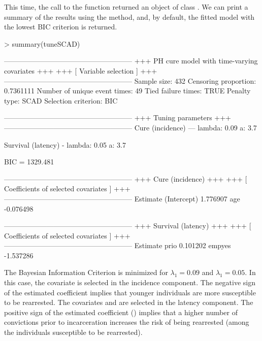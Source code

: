 This time, the call to the  function returned an object of class . 
We can print a summary of the results using the  method, and, by default, the fitted model with the lowest BIC criterion is returned.


\begin{example}
> summary(tuneSCAD)

------------------------------------------------------
+++   PH cure model with time-varying covariates   +++
+++             [ Variable selection ]             +++
------------------------------------------------------
Sample size:  432
Censoring proportion:  0.7361111
Number of unique event times: 49
Tied failure times:  TRUE
Penalty type:  SCAD
Selection criterion:  BIC

------------------------------------------------------
+++               Tuning parameters                +++
------------------------------------------------------
 Cure (incidence) --- lambda:  0.09 
                           a:  3.7 

 Survival (latency) - lambda:  0.05 
                           a:  3.7 

 BIC =  1329.481 

------------------------------------------------------
+++                Cure (incidence)                +++
+++     [ Coefficients of selected covariates ]    +++
------------------------------------------------------
             Estimate
(Intercept)  1.776907
age         -0.076498

------------------------------------------------------
+++              Survival (latency)                +++
+++     [ Coefficients of selected covariates ]    +++
------------------------------------------------------
        Estimate
prio    0.101202
empyes -1.537286
\end{example}

The Bayesian Information Criterion is minimized for $\lambda_1=0.09$ and $\lambda_1=0.05$. 
In this case, the covariate  is selected in the incidence component.
The negative sign of the estimated coefficient implies that younger individuals are more susceptible to be rearrested.
The covariates  and  are selected in the latency component.
The positive sign of the estimated coefficient () implies that a higher number of convictions prior to incarceration increases the risk of being rearrested (among the individuals susceptible to be rearrested). 

